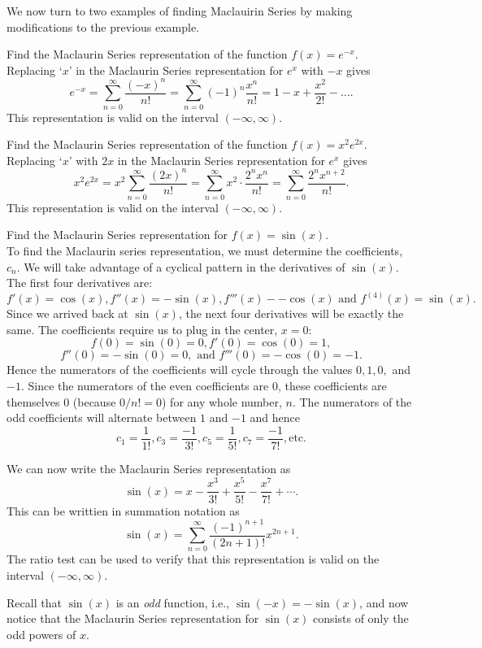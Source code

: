\documentclass{ximera}
\begin{document}
We now turn to two examples of finding Maclauirin Series by making modifications to the previous example.

\begin{example}[example 2] 
Find the Maclaurin Series representation of the function $f(x) = e^{-x}$.\\
Replacing `$x$' in the Maclaurin Series representation for $e^x$ with $-x$ gives
\[
e^{-x} = \sum_{n=0}^\infty \frac{(-x)^n}{n!} = \sum_{n=0}^\infty (-1)^n \frac{x^n}{n!} = 1 - x + \frac{x^2}{2!} - \dots.
\]
This representation is valid on the interval $(-\infty, \infty)$.
\end{example}


\begin{example}[example 3] 
Find the Maclaurin Series representation of the function $f(x) = x^2 e^{2x}$.\\
Replacing `$x$' with $2x$ in the Maclaurin Series representation for $e^x$ gives
\[
x^2 e^{2x} = x^2\sum_{n=0}^\infty \frac{(2x)^n}{n!} = \sum_{n=0}^\infty x^2 \cdot \frac{2^n x^n}{n!} = \sum_{n=0}^\infty \frac{2^n x^{n+2}}{n!}.
\]
This representation is valid on the interval $(-\infty, \infty)$.
\end{example}


\begin{example} 
Find the Maclaurin Series representation for $f(x) = \sin(x)$.\\
To find the Maclaurin series representation, we must determine the coefficients, $c_n$. 
We will take advantage of a cyclical pattern in the derivatives of $\sin(x)$.
The first four derivatives are:
\[
f'(x) = \cos(x), f''(x) = -\sin(x), f'''(x) - -\cos(x) \text{ and } f^{(4)}(x) = \sin(x).
\]
Since we arrived back at $\sin(x)$, the next four derivatives will be exactly the same.
The coefficients require us to plug in the center, $x = 0$:
\[
f(0) = \sin(0) = 0, f'(0) = \cos(0) = 1,
\]
\[
 f''(0) = -\sin(0) = 0, \text{ and } f'''(0) = -\cos(0) = -1.
\]
Hence the numerators of the coefficients will cycle through the values $0, 1, 0,$ and $-1$.
Since the numerators of the even coefficients are 0, these coefficients are themselves 0 (because $0/n! = 0$) for any whole number, $n$.
The numerators of the odd coefficients will alternate between $1$ and $-1$ and hence 
\[
c_1 = \frac{1}{1!}, c_3 = \frac{-1}{3!}, c_5 = \frac{1}{5!}, c_7 = \frac{-1}{7!}, \text{etc}.
\]

We can now write the Maclaurin Series representation as
\[
\sin(x) =  x - \frac{x^3}{3!} + \frac{x^5}{5!} - \frac{x^7}{7!} + \cdots.
\]
This can be writtien in summation notation as
\[
\sin(x) = \sum_{n=0}^\infty \frac{(-1)^{n+1}}{(2n+1)!}x^{2n+1}.
\]
The ratio test can be used to verify that this representation is valid on the interval $(-\infty, \infty)$.
\begin{remark}
Recall that $\sin(x)$ is an \textit{odd} function, 
i.e., $\sin(-x) = -\sin(x)$, and now notice that the Maclaurin Series representation for $\sin(x)$ consists of only the 
odd powers of $x$. 
\end{remark}
\end{example}
\end{document}
